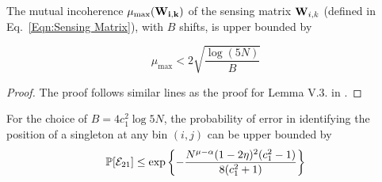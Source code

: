 \begin{lemma}[Mutual Incoherence Bound for sub-sampled IDFT matrix  [\cite{pawar2014robust},Proposition~A.1]
\label{lemma:MutualCoherence}
	The mutual incoherence $\mu_{\text{max}} (\mathbf{W_{i,k}})$ of the sensing matrix $\mathbf{W}_{i,k}$ (defined in Eq.~\ref{Eqn:Sensing Matrix}), with $B$ shifts, is upper bounded by
	
	\[ \mu_{\text{max}} < 2\sqrt{\frac{\log(5N)}{B}} \] 
	
\end{lemma}
\begin{proof}
	The proof follows similar lines as the proof for Lemma V.3. in \cite{pawar2014robust}.
\end{proof}
 
\begin{lemma}
For the choice of $B=4c_1^2\log 5N$, the probability of error in identifying the position of a singleton at any bin $(i,j)$ can be upper bounded by
\begin{align*}
\mathbb{P}[\mathcal{E}_{21}]\leq \exp\left\lbrace-\frac{N^{\mu-\alpha}(1-2\eta)^2(c_1^2-1)}{8(c_1^2+1)}\right\rbrace
\end{align*}
\end{lemma}
